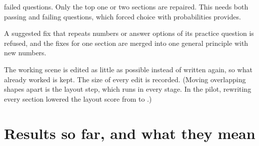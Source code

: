 \documentclass[11pt]{article}
\begin{document}
\begin{description}
  failed questions. Only the top one or two sections are repaired. This needs both passing and failing questions,
  which forced choice with probabilities provides.
  \item[F4, stop teaching the practice test.] A suggested fix that repeats numbers or answer options of its practice
  question is refused, and the fixes for one section are merged into one general principle with new numbers.
  \item[F5, edit instead of rewrite.] The working scene is edited as little as possible instead of written again, so
  what already worked is kept. The size of every edit is recorded. (Moving overlapping shapes apart is the layout
  step, which runs in every stage. In the pilot, rewriting every section lowered the layout score from
  \PilotLayoutBase{} to \PilotLayoutAll{}.)
\end{description}

\DiagSBFL
{}


\section{Results so far, and what they mean}\label{sec:results-long}
\end{document}
